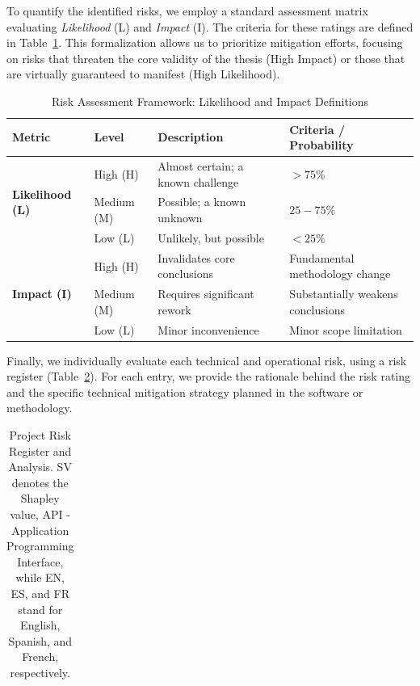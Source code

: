 \begin{appendices}
    To quantify the identified risks, we employ a standard assessment matrix evaluating \textit{Likelihood} (L) and \textit{Impact} (I). The criteria for these ratings are defined in Table~\ref{tab:requirements__rating__tab}. This formalization allows us to prioritize mitigation efforts, focusing on risks that threaten the core validity of the thesis (High Impact) or those that are virtually guaranteed to manifest (High Likelihood).

    \begin{table}[t!]
        \centering
        \small
        \caption{Risk Assessment Framework: Likelihood and Impact Definitions}
        \label{tab:requirements__rating__tab}
        \begin{tabular}{@{}llll@{}}
            \toprule
            \textbf{Metric} & \textbf{Level} & \textbf{Description} & \textbf{Criteria / Probability} \\
            \midrule
            \multirow{3}{*}{\textbf{Likelihood (L)}}
                & High (H) & Almost certain; a known challenge & $>75\%$ \\
                & Medium (M) & Possible; a known unknown & $25-75\%$ \\
                & Low (L) & Unlikely, but possible & $<25\%$ \\
            \midrule
            \multirow{3}{*}{\textbf{Impact (I)}}
                & High (H) & Invalidates core conclusions & Fundamental methodology change \\
                & Medium (M) & Requires significant rework & Substantially weakens conclusions \\
                & Low (L) & Minor inconvenience & Minor scope limitation \\
            \bottomrule
        \end{tabular}
    \end{table}

    Finally, we individually evaluate each technical and operational risk, using a risk register (Table~\ref{tab:risk_register_detailed}). For each entry, we provide the rationale behind the risk rating and the specific technical mitigation strategy planned in the software or methodology.

    \clearpage
    {
    \small
    \setlength{\tabcolsep}{5pt}
    \setcounter{LTchunksize}{10}
    \begin{longtable}{@{} p{0.3cm} p{4cm} p{0.2cm} p{0.2cm} p{4.6cm} p{4.6cm} @{}}
        \caption{Project Risk Register and Analysis. SV denotes the Shapley value, API - Application Programming Interface, while EN, ES, and FR stand for English, Spanish, and French, respectively.}
        \label{tab:risk_register_detailed} \\


\end{longtable}}
\end{appendices}
